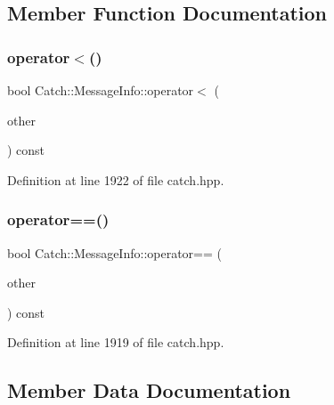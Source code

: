 \subsection{Member Function Documentation}
\hypertarget{struct_catch_1_1_message_info_a8254cb8fca2da02a29a9843cdcb79df1}{}\label{struct_catch_1_1_message_info_a8254cb8fca2da02a29a9843cdcb79df1} 
\subsubsection{\texorpdfstring{operator$<$()}{operator<()}}
{\footnotesize\ttfamily bool Catch\+::\+Message\+Info\+::operator$<$ (\begin{DoxyParamCaption}\item[{\hyperlink{struct_catch_1_1_message_info}{Message\+Info} const \&}]{other }\end{DoxyParamCaption}) const\hspace{0.3cm}{\ttfamily [inline]}}



Definition at line 1922 of file catch.\+hpp.

\hypertarget{struct_catch_1_1_message_info_af4b37f2172ba55395813b4bb6bbbde1a}{}\label{struct_catch_1_1_message_info_af4b37f2172ba55395813b4bb6bbbde1a} 
\subsubsection{\texorpdfstring{operator==()}{operator==()}}
{\footnotesize\ttfamily bool Catch\+::\+Message\+Info\+::operator== (\begin{DoxyParamCaption}\item[{\hyperlink{struct_catch_1_1_message_info}{Message\+Info} const \&}]{other }\end{DoxyParamCaption}) const\hspace{0.3cm}{\ttfamily [inline]}}



Definition at line 1919 of file catch.\+hpp.



\subsection{Member Data Documentation}
\hypertarget{struct_catch_1_1_message_info_a985165328723e599696ebd8e43195cc5}{}\label{struct_catch_1_1_message_info_a985165328723e599696ebd8e43195cc5} 
